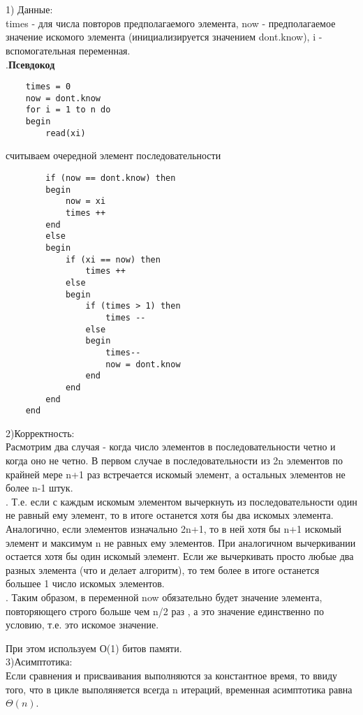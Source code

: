 \documentclass[a4paper,12pt]{article} %
\begin{document}
\section{}
1) Данные:\\
times - для числа повторов предполагаемого элемента, now - предполагаемое значение искомого элемента (инициализируется значением dont.know), i - вспомогательная переменная.\\
.\hspace{100pt}\textbf{Псевдокод}\\
	\begin{lstlisting}	
	times = 0
	now = dont.know
	for i = 1 to n do
	begin
		read(xi) 
 \end{lstlisting}
		 считываем очередной элемент последовательности
\begin{lstlisting}	
		if (now == dont.know) then
		begin
			now = xi
			times ++
		end
		else 
		begin
			if (xi == now) then
				times ++
			else 
			begin
				if (times > 1) then
					times --
				else
				begin
					times--
					now = dont.know
				end
			end
		end
	end
\end{lstlisting}
2)Корректность:\\
Расмотрим два случая - когда число элементов в последовательности четно и когда оно не четно. В первом случае в последовательности из 2n элементов по крайней мере n+1 раз встречается искомый элемент, а остальных элементов не более n-1 штук.\\
.\hspace{50pt} Т.е. если с каждым искомым элементом вычеркнуть из последовательности один не равный ему элемент, то в итоге останется хотя бы два искомых элемента. Аналогично, если элементов изначально 2n+1, то в ней хотя бы n+1 искомый элемент и максимум n не равных ему элементов. При аналогичном вычеркивании остается хотя бы один искомый элемент.
Если же вычеркивать просто любые два разных элемента (что и делает алгоритм), то тем более в итоге останется большее 1 число искомых элементов.\\
.\hspace{50pt} Таким образом, в переменной now обязательно будет значение элемента, повторяющего строго больше чем n/2 раз , а это значение единственно по условию, т.е. это искомое значение.

При этом используем О(1) битов памяти.\\

3)Асимптотика:\\
Если сравнения и присваивания выполняются за константное время, то ввиду того, что в цикле выполяняется всегда n итераций, временная асимптотика равна $\Theta(n)$.\\
\end{document}
